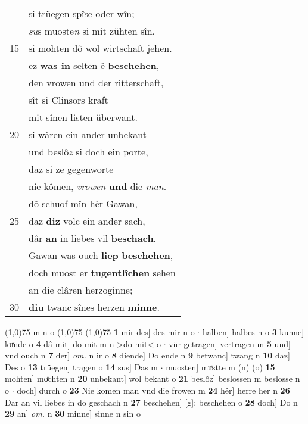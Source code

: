 \documentclass[8pt,a4paper,notitlepage]{article}
\begin{document}
\begin{table}[ht]
\begin{minipage}[t]{0.5\linewidth}
\begin{tabular}{rl}
 & si trüegen spîse oder wîn;\\ 
 & \textit{su}s muoste\textit{n} si mit zühten sîn.\\ 
15 & si mohten dô wol wirtschaft jehen.\\ 
 & ez \textbf{was in} selten ê \textbf{beschehen},\\ 
 & den vrowen und der ritterschaft,\\ 
 & sît si Clinsors kraft\\ 
 & mit sînen listen überwant.\\ 
20 & si wâren ein ander unbekant\\ 
 & und beslô\textit{z} si doch ein porte,\\ 
 & daz si ze gegenworte\\ 
 & nie kômen, \textit{vrowen} \textbf{und} die \textit{man}.\\ 
 & dô schuof mîn hêr Gawan,\\ 
25 & daz \textbf{diz} volc ein ander sach,\\ 
 & dâr \textbf{an} in liebes vil \textbf{beschach}.\\ 
 & Gawan was ouch \textbf{liep} \textbf{beschehen},\\ 
 & doch muost er \textbf{tugentlîchen} sehen\\ 
 & an die clâren herzoginne;\\ 
30 & \textbf{diu} twanc sînes herzen \textbf{minne}.\\ 
\end{tabular}
\scriptsize
\line(1,0){75} \newline
m n o \newline
\line(1,0){75} \newline
\newline
\line(1,0){75} \newline
\textbf{1} mir des] des mir n o  $\cdot$ halben] halbes n o \textbf{3} kunne] kuͯnde o \textbf{4} dâ mit] do mit m n >do mit< o  $\cdot$ vür getragen] vertragen m \textbf{5} und] vnd ouch n \textbf{7} der] \textit{om.} n ir o \textbf{8} diende] Do ende n \textbf{9} betwanc] twang n \textbf{10} daz] Des o \textbf{13} trüegen] tragen o \textbf{14} sus] Das m  $\cdot$ muosten] muͯstte m (n) (o) \textbf{15} mohten] moͯchten n \textbf{20} unbekant] wol bekant o \textbf{21} beslôz] beslossen m beslosse n o  $\cdot$ doch] durch o \textbf{23} Nie komen man vnd die frowen m \textbf{24} hêr] herre her n \textbf{26} Dar an vil liebes in do geschach n \textbf{27} beschehen] [g]: beschehen o \textbf{28} doch] Do n \textbf{29} an] \textit{om.} n \textbf{30} minne] sinne n sin o \newline
\end{minipage}
\end{table}
\end{document}
